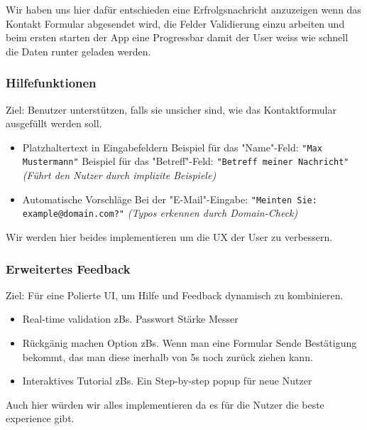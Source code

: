 \documentclass[10pt]{article}
\begin{document}
	Wir haben uns hier dafür entschieden eine Erfrolgsnachricht anzuzeigen wenn das Kontakt Formular abgesendet wird, die Felder Validierung einzu arbeiten und beim ersten starten der App eine Progressbar damit der User weiss wie schnell die Daten runter geladen werden.
	
	\subsubsection{Hilfefunktionen}
	
	Ziel: Benutzer unterstützen, falls sie unsicher sind, wie das Kontaktformular ausgefüllt werden soll.
	
	\begin{itemize}
		\item Platzhaltertext in Eingabefeldern
			\subitem Beispiel für das "Name"-Feld:
				\subsubitem \texttt{"Max Mustermann"}
			\subitem Beispiel für das "Betreff"-Feld:
				\subsubitem \texttt{"Betreff meiner Nachricht"}
				\subsubitem \textit{(Führt den Nutzer durch implizite Beispiele)}
		
		\item Automatische Vorschläge
			\subitem Bei der "E-Mail"-Eingabe:
				\subsubitem \texttt{"Meinten Sie: example@domain.com?"}
				\subsubitem \textit{(Typos erkennen durch Domain-Check)}
	\end{itemize}
	
	Wir werden hier beides implementieren um die UX der User zu verbessern.
	
	\subsubsection{Erweitertes Feedback}
	
	Ziel: Für eine Polierte UI, um Hilfe und Feedback dynamisch zu kombinieren.
	
	\begin{itemize} 
		\item Real-time validation
			\subitem zBs. Passwort Stärke Messer
		\item Rückgänig machen Option
			\subitem zBs. Wenn man eine Formular Sende Bestätigung bekommt, das man diese inerhalb von 5s noch zurück ziehen kann.
		\item Interaktives Tutorial
			\subitem zBs. Ein Step-by-step popup für neue Nutzer
	\end{itemize}
	
	Auch hier würden wir alles implementieren da es für die Nutzer die beste experience gibt.
	
\end{document}
